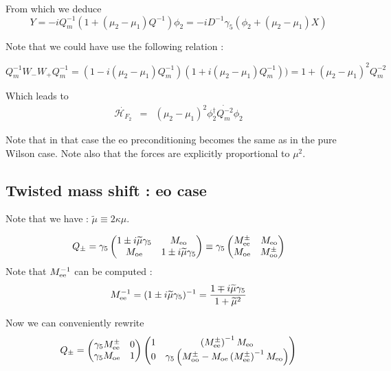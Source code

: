 \documentclass{article}[12pt]
\begin{document}
From which we deduce 
\begin{equation}
Y =   -i Q_m^{-1}(1 +  (\mu_2-\mu_1)Q^{-1})  \phi_2 =  -i D^{-1}  \gamma_5( \phi_2  +(\mu_2-\mu_1)  X)  
\end{equation}


Note that we could have use the following relation :

\begin{equation}
Q_m^{-1} W_- W_+ Q_m^{-1} = ( 1 - i(\mu_2-\mu_1)Q_m^{-1}) (1+ i(\mu_2-\mu_1)Q_m^{-1}))
= 1 + (\mu_2-\mu_1)^2 Q_m^{-2}
\end{equation}

Which leads to 
\begin{eqnarray}
 \dot{\mathcal{H}_{F_2}}  &=& (\mu_2-\mu_1)^2 \phi_2^{\dagger} \dot{Q_m^{-2}} \phi_2
\end{eqnarray}

Note that in that case the eo preconditioning becomes the same as in
the pure Wilson case. Note also that the forces are explicitly
proportional to $\mu^2$.

\subsection{Twisted mass shift : eo case}

Note that we have : $\widetilde{\mu} \equiv 2 \kappa \mu$.

\begin{equation}
Q_{\pm}= \gamma_5 \begin{pmatrix} 
1 \pm i \widetilde{\mu} \gamma_5 & M_{\rm{eo}} \\
M_{\rm{oe}} & 1 \pm i \widetilde{\mu} \gamma_5\\
\end{pmatrix} \equiv \gamma_5 \begin{pmatrix} 
M^{\pm}_{\rm{ee}}  & M_{\rm{eo}} \\
M_{\rm{oe}} & M^{\pm}_{\rm{oo}}\\
\end{pmatrix}
\end{equation}
Note that $M_{\rm{ee}}^{-1}$ can be computed : 
\begin{equation}
M_{\rm{ee}}^{-1} = ( 1 \pm i\widetilde{\mu} \gamma_5)^{-1} = \frac{1\mp
i \widetilde{\mu}\gamma_5 }{ 1 + \widetilde{\mu}^2}
\end{equation}


Now we can conveniently rewrite 
\begin{equation}
Q_{\pm} =  \begin{pmatrix} 
\gamma_5 M^{\pm}_{\rm{ee}}  & 0 \\ \gamma_5 M_{\rm{oe}} & 1\\
\end{pmatrix} \begin{pmatrix} 
1  &  \left(M^{\pm}_{\rm{ee}}\right)^{-1} M_{\rm{eo}} \\0 & \gamma_5
  \left(M^{\pm}_{\rm{oo}} - M_{\rm{oe}}
    \left(M^{\pm}_{\rm{ee}}\right)^{-1} M_{\rm{eo}} \right)\\
\end{pmatrix} 
\end{equation}
\end{document}
